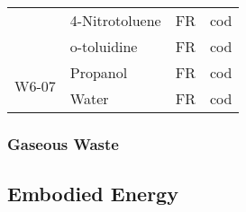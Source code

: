 \begin{table}[]
\begin{tabular}{@{}llll@{}}
                       & 4-Nitrotoluene          & FR                                                                 & cod                                                         \\
                       & o-toluidine             & FR                                                                 & cod                                                         \\
\multirow{2}{*}{W6-07} & Propanol                & FR                                                                 & cod                                                         \\
                       & Water                   & FR                                                                 & cod                                                         \\ \cmidrule(l){2-4} 
\end{tabular}
\end{table}













\subsubsection{Gaseous Waste}

\subsection{Embodied Energy}